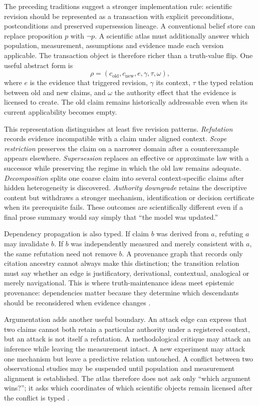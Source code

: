 The preceding traditions suggest a stronger implementation rule: scientific revision should be represented as a transaction with explicit preconditions, postconditions and preserved supersession lineage. A conventional belief store can replace proposition \(p\) with \(\neg p\). A scientific atlas must additionally answer which population, measurement, assumptions and evidence made each version applicable. The transaction object is therefore richer than a truth-value flip. One useful abstract form is
\[
\rho=(c_{\mathrm{old}},c_{\mathrm{new}},e,\gamma,\tau,\omega),
\]
where \(e\) is the evidence that triggered revision, \(\gamma\) its context, \(\tau\) the typed relation between old and new claims, and \(\omega\) the authority effect that the evidence is licensed to create. The old claim remains historically addressable even when its current applicability becomes empty.

This representation distinguishes at least five revision patterns. \emph{Refutation} records evidence incompatible with a claim under aligned context. \emph{Scope restriction} preserves the claim on a narrower domain after a counterexample appears elsewhere. \emph{Supersession} replaces an effective or approximate law with a successor while preserving the regime in which the old law remains adequate. \emph{Decomposition} splits one coarse claim into several context-specific claims after hidden heterogeneity is discovered. \emph{Authority downgrade} retains the descriptive content but withdraws a stronger mechanism, identification or decision certificate when its prerequisite fails. These outcomes are scientifically different even if a final prose summary would say simply that ``the model was updated.''

Dependency propagation is also typed. If claim \(b\) was derived from \(a\), refuting \(a\) may invalidate \(b\). If \(b\) was independently measured and merely consistent with \(a\), the same refutation need not remove \(b\). A provenance graph that records only citation ancestry cannot always make this distinction; the transition relation must say whether an edge is justificatory, derivational, contextual, analogical or merely navigational. This is where truth-maintenance ideas meet epistemic provenance: dependencies matter because they determine which descendants should be reconsidered when evidence changes \cite{doyle1979,dekleer1986}.

Argumentation adds another useful boundary. An attack edge can express that two claims cannot both retain a particular authority under a registered context, but an attack is not itself a refutation. A methodological critique may attack an inference while leaving the measurement intact. A new experiment may attack one mechanism but leave a predictive relation untouched. A conflict between two observational studies may be suspended until population and measurement alignment is established. The atlas therefore does not ask only ``which argument wins?''; it asks which coordinates of which scientific objects remain licensed after the conflict is typed \cite{dung1995}.


